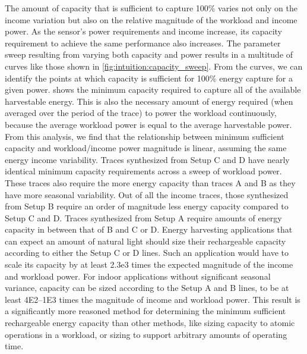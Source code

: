 The amount of capacity that is sufficient to capture 100\% varies not only on the income variation but also on the relative magnitude of the workload and income power.
As the sensor's power requirements and income increase, its capacity requirement to achieve the same performance also increases. 
The parameter sweep resulting from varying both capacity and power results in a multitude of curves like those shown in \cref{fig:intuition:capacity_sweep}. 
From the curves, we can identify the points at which capacity is sufficient for 100\% energy capture for a given power.  shows the minimum capacity required to capture all of the available harvestable energy. This is also the necessary amount of energy required (when averaged over the period of the trace) to power the workload continuously, because the average workload power is equal to the average harvestable power. 
From this analysis, we find that the relationship between minimum sufficient capacity and workload/income power magnitude is linear, assuming the same energy income variability. 
Traces synthesized from Setup C and D have nearly identical minimum capacity requirements across a sweep of workload power. These traces also require the more energy capacity than traces A and B as they have more seasonal variability. 
Out of all the income traces, those synthesized from Setup B require an order of magnitude less energy capacity compared to Setup C and D. 
Traces synthesized from Setup A require amounts of energy capacity in between that of B and C or D.
Energy harvesting applications that can expect an amount of natural light should size their rechargeable capacity according to either the Setup C or D lines. Such an application would have to scale its capacity by at least {2.3e3} times the expected magnitude of the income and workload power.
For indoor applications without significant seasonal variance, capacity can be sized according to the Setup A and B lines, to be at least \num{4E2}--\num{1E3} times the magnitude of income and workload power.
This result is a significantly more reasoned method for determining the minimum sufficient rechargeable energy capacity than other methods, like sizing capacity to atomic operations in a workload, or sizing to support arbitrary amounts of operating time.

